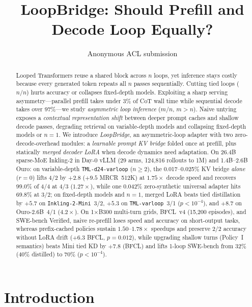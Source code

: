 \documentclass[11pt]{article}
\title{LoopBridge: Should Prefill and Decode Loop Equally?}
\author{Anonymous ACL submission}
\begin{document}
\raggedbottom
\maketitle

\begin{abstract}
Looped Transformers reuse a shared block across $n$ loops, yet inference stays costly because every generated token
repeats all $n$ passes sequentially. Cutting tied loops ($n/n$) hurts accuracy or collapses fixed-depth models.
Exploiting a sharp serving asymmetry---parallel prefill takes under 3\% of CoT wall time while sequential decode takes
over 97\%---we study \emph{asymmetric loop inference} ($m/n$, $m{>}n$). Naive untying exposes a \emph{contextual
representation shift} between deeper prompt caches and shallow decode passes, degrading retrieval on variable-depth
models and collapsing fixed-depth models or $n{=}1$. We introduce \emph{LoopBridge}, an asymmetric-loop adapter with
two zero-decode-overhead modules: a \emph{learnable prompt KV bridge} folded once at prefill, plus statically
\emph{merged decoder LoRA} when decode dynamics need adaptation. On 26.4B sparse-MoE Inkling-2 in Day-0 vLLM (29 arms,
124,816 rollouts to 1M) and 1.4B--2.6B Ouro: on variable-depth \texttt{TML-d24-varloop} ($n{\ge}2$), the
0.017--0.025\% KV bridge \emph{alone} ($r{=}0$) lifts 4/2 by $+2.8$ ($+9.5$ MRCR~512K) at $1.75\times$ decode speed
and recovers 99.0\% of 4/4 at 4/3 ($1.27\times$), while one 0.042\% zero-synthetic universal adapter hits 69.8\% at
3/2; on fixed-depth models and $n{=}1$, merged LoRA beats tied distillation by $+5.7$ on \texttt{Inkling-2-Mini}~3/2,
$+5.3$ on \texttt{TML-varloop}~3/1 ($p{<}10^{-4}$), and $+8.7$ on Ouro-2.6B~4/1 ($4.2\times$). On 1$\times$B300
multi-turn grids, BFCL~v4 (15,200 episodes), and SWE-bench Verified, naive re-prefill loses speed and accuracy on
short-output tasks, whereas prefix-cached policies sustain $1.50$--$1.78\times$ speedups and preserve 2/2 accuracy
without LoRA drift ($+6.3$ BFCL, $p{=}0.012$), while upgrading shallow turns (Policy~I semantics) beats Mini tied KD
by $+7.8$ (BFCL) and lifts 1-loop SWE-bench from 32\% (40\% distilled) to 70\% ($p{<}10^{-4}$).
\end{abstract}

\section{Introduction}
\label{sec:intro}
\end{document}
